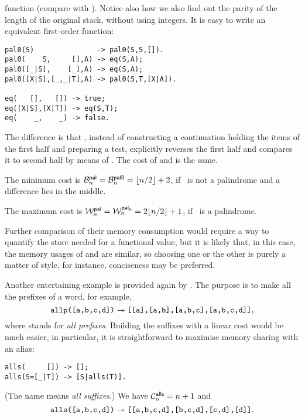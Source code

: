 function (compare with ). Notice also how we also find
out the parity of the length of the original stack, without using
integers. It is easy to write an equivalent first\hyp{}order function:
\begin{verbatim}
pal0(S)               -> pal0(S,S,[]).
pal0(    S,     [],A) -> eq(S,A);
pal0([_|S],    [_],A) -> eq(S,A);
pal0([X|S],[_,_|T],A) -> pal0(S,T,[X|A]).

eq(   [],   []) -> true;
eq([X|S],[X|T]) -> eq(S,T);
eq(    _,    _) -> false.
\end{verbatim}
The difference is that , instead of constructing a
continuation holding the items of the first half and preparing a test,
explicitly reverses the first half and compares it to second half by
means of . The cost of  and
 is the same. 

The minimum cost is \(\B{\fun{pal}}{n} = \B{\fun{pal0}}{n} =
\floor{n/2} + 2\), if ~is not a palindrome and a difference
lies in the middle.

The maximum cost is \(\W{\fun{pal}}{n} = \W{\fun{pal}_0}{n} =
2\floor{n/2} + 1\), if ~is a
palindrome.

Further comparison of their memory consumption would require a way to
quantify the store needed for a functional value, but it is likely
that, in this case, the memory usages of  and
 are similar, so choosing one or the other is purely a
matter of style, for instance, conciseness may be preferred.


Another entertaining example is provided again by
\cite{Danvy_1988,Danvy_1989}. The purpose is to make all the prefixes
of a word, for example,
\begin{equation*}
\erlcode{allp([a,b,c,d])} \twoheadrightarrow
\erlcode{[[a],[a,b],[a,b,c],[a,b,c,d]]},
\end{equation*}
where  stands for \emph{all prefixes}. Building the
suffixes with a linear cost would be much easier, in particular, it is
straightforward to maximise memory sharing with an alias:
\begin{verbatim}
alls(     []) -> [];
alls(S=[_|T]) -> [S|alls(T)].
\end{verbatim}
(The name  means \emph{all suffixes}.) We have
\(\C{\fun{alls}}{n} = n + 1\) and
\begin{equation*}
\erlcode{alls([a,b,c,d])}
\twoheadrightarrow \erlcode{[[a,b,c,d],[b,c,d],[c,d],[d]]}.
\end{equation*}

